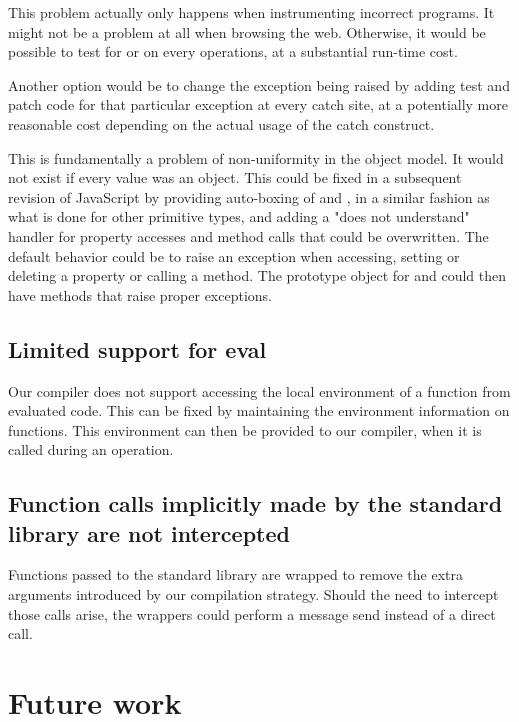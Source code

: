 This problem actually only happens when instrumenting incorrect programs. It
might not be a problem at all when browsing the web. Otherwise, it would be
possible to test for  or  on every operations, at a
substantial run-time cost.

Another option would be to change the exception being raised by adding test and
patch code for that particular exception at every catch site, at a
potentially more reasonable cost depending on the actual usage of the catch
construct.

This is fundamentally a problem of non-uniformity in the object model. It would
not exist if every value was an object.  This could be fixed in a subsequent
revision of JavaScript by providing auto-boxing of  and
, in a similar fashion as what is done for other primitive types,
and adding a "does not understand" handler for property accesses and method
calls that could be overwritten. The default behavior could be to raise an
exception when accessing, setting or deleting a property or calling a method.
The prototype object for  and  could then have methods that
raise proper exceptions.

\subsection{Limited support for eval}

Our compiler does not support accessing the local environment of a function
from evaluated code. This can be fixed by maintaining the environment
information on functions. This environment can then be provided to our
compiler, when it is called during an  operation.

\subsection{Function calls implicitly made by the standard library are not intercepted}

Functions passed to the standard library are wrapped to remove the extra
arguments introduced by our compilation strategy. Should the need to intercept
those calls arise, the wrappers could perform a message send instead of a
direct call.
 
\section{Future work}

